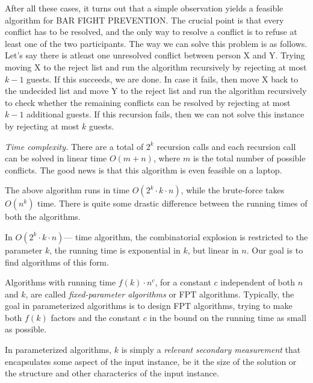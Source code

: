 After all these cases, it turns out that a simple observation yields a feasible algorithm for BAR FIGHT PREVENTION.
The crucial point is that every conflict has to be resolved, and the only way to resolve a conflict is to refuse at least one of the two participants.
The way we can solve this problem is as follows. Let's say there is atleast one unresolved conflict between person X and Y.
Trying moving X to the reject list and run the algorithm recursively by rejecting at most $k-1$ guests. If this succeeds, we are done.
In case it fails, then move X back to the undecided list and move Y to the reject list and run the algorithm recursively to check
whether the remaining conflicts can be resolved by rejecting  at most $k-1$ additional guests.
If this recursion fails, then we can not solve this instance by rejecting at most $k$ guests.

\textit{Time complexity.} There are a total of $2^k$ recursion calls and each recursion call can be solved in linear time $O(m+n)$, where $m$ is the total number of possible conflicts.
The good news is that this algorithm is even feasible on a laptop.


The above algorithm runs in time $O(2^k \cdot k \cdot n)$, while the brute-force takes $O(n^k)$ time.
There is quite some drastic difference between the running times of both the algorithms.

In $O(2^k \cdot k \cdot n)$--- time algorithm, the combinatorial explosion is restricted to the parameter $k$,
the running time is exponential in $k$, but linear in $n$.
Our goal is to find algorithms of this form.

\begin{definition}
 Algorithms with running time $f(k)\cdot n^c$, for a constant $c$ independent of both $n$ and $k$, are called \textit{fixed-parameter algorithms} or FPT algorithms.
 Typically, the goal in parameterized algorithms is to design FPT algorithms, trying to make both $f(k)$ factors and the constant $c$ in the bound on the running time as small as possible.
 
 In parameterized algorithms, $k$ is simply a \textit{relevant secondary measurement} that encapsulates some aspect of the input instance, be it the size of the solution or the structure and other characterics of the input instance.
\end{definition}


